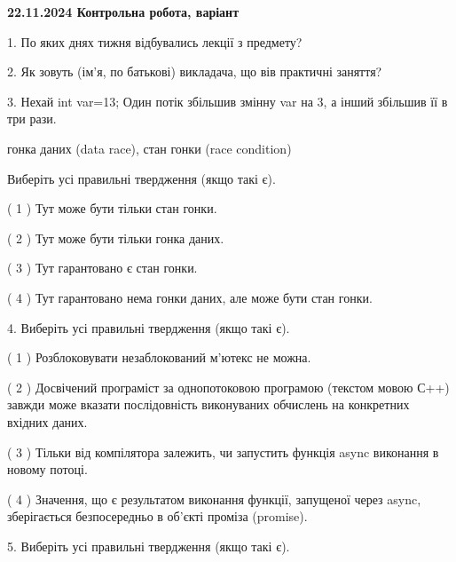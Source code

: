 \documentclass[12pt, ukrainian]{article}
\begin{document}
\vspace{4mm}
\newpage
\begin {large}

\textbf{22.11.2024 Контрольна робота, варіант  }\par


{
1. По яких днях тижня відбувались лекції з предмету?



\vspace{5mm}
2. Як зовуть (ім'я, по батькові) викладача, що вів практичні заняття?



\vspace{5mm}
3. Нехай int var=13; Один потік збільшив змінну var на 3, а інший збільшив її в три рази.

гонка даних (data race), стан гонки (race condition)

Виберіть усі правильні твердження (якщо такі є).\par
\vspace{2mm}
( 1 ) Тут може бути тільки стан гонки.%

( 2 ) Тут може бути тільки гонка даних.%

( 3 ) Тут гарантовано є стан гонки.%

( 4 ) Тут гарантовано нема гонки даних, але може бути стан гонки.%


\vspace{5mm}
4. Виберіть усі правильні твердження (якщо такі є).\par
\vspace{2mm}

( 1 ) Розблоковувати незаблокований м’ютекс не можна.%

( 2 ) Досвічений програміст за однопотоковою програмою (текстом мовою С++) завжди може вказати послідовність виконуваних обчислень на конкретних вхідних даних.%

( 3 ) Тільки від компілятора залежить, чи запустить функція async виконання в новому потоці.%

( 4 ) Значення, що є результатом виконання функції, запущеної через async, зберігається безпосередньо в об’єкті проміза (promise).%


\vspace{5mm}
5. Виберіть усі правильні твердження (якщо такі є).\par
\vspace{2mm}

}
\end{large}
\end{document}
